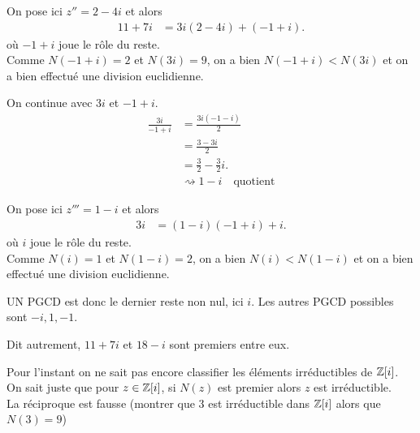 {\begin{td-sol}[]
\begin{enumerate}
            On pose ici \(z'' = 2-4i\) et alors
            \begin{equation*}
                \begin{aligned}
                    11 + 7i
                    &= 3i(2-4i) + (-1 + i).
                \end{aligned}
            \end{equation*}
            où \(-1+i\) joue le rôle du reste.\\
            Comme \(N(-1+i) = 2\) et \(N(3i) = 9\), on a bien \(N(-1+i) < N(3i)\)
            et on a bien effectué une division euclidienne.

            On continue avec \(3i\) et \(-1+i\).
            \begin{equation*}
                \begin{aligned}
                    \frac{3i}{-1+i}
                    &= \frac{3i(-1-i)}{2}\\
                    &= \frac{3-3i}{2}\\
                    &= \frac{3}{2} - \frac{3}{2}i.\\
                    &\rightsquigarrow 1 - i\quad\text{quotient}
                \end{aligned}
            \end{equation*}

            On pose ici \(z''' = 1-i\) et alors %
            \begin{equation*}
                \begin{aligned}
                    3i
                    &= (1-i)(-1+i) + i.
                \end{aligned}
            \end{equation*}
            où \(i\) joue le rôle du reste.\\
            Comme \(N(i) = 1\) et \(N(1-i) = 2\), on a bien \(N(i) < N(1-i)\)
            et on a bien effectué une division euclidienne.

            UN PGCD est donc le dernier reste non nul, ici \(i\).
            Les autres PGCD possibles sont \(-i,1,-1\).

            Dit autrement, \(11+7i\) et \(18-i\) sont premiers entre eux.
            \begin{remark}
                Pour l'instant on ne sait pas encore classifier les
                éléments irréductibles de \(\mathbb{Z}[i]\).\\
                On sait juste que pour \(z\in\mathbb{Z}[i]\), si \(N(z)\) est
                premier alors \(z\) est irréductible.\\
                La réciproque est fausse (montrer que
                3 est irréductible dans \(\mathbb{Z}[i]\) alors que
                \(N(3) = 9\))
            \end{remark}
        \end{enumerate}
    \end{td-sol}
}{}
